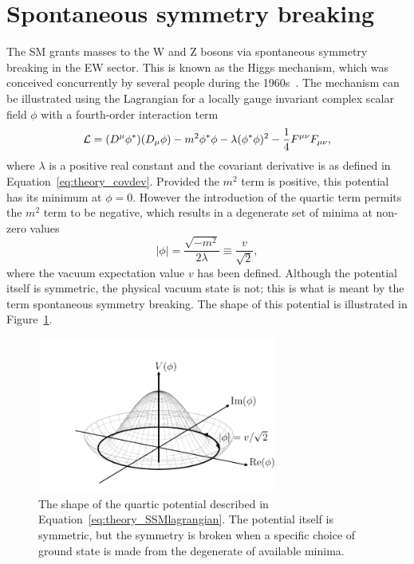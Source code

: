 \section{Spontaneous symmetry breaking}

The SM grants masses to the W and Z bosons via spontaneous symmetry breaking 
in the EW sector.
This is known as the Higgs mechanism, 
which was conceived concurrently by several people 
during the 1960s~\cite{HiggsPaper,BroutEnglert,KibbleEtc}.
The mechanism can be illustrated using the Lagrangian 
for a locally gauge invariant complex scalar field $\phi$ 
with a fourth-order interaction term~\cite{Thomson}
\begin{equation}
\label{eq:theory_SSMlagrangian}
\mathcal{L} = (D^\mu \phi^*) (D_\mu \phi) - m^2 \phi^*\phi 
        - \lambda (\phi^*\phi)^2 - \frac{1}{4} F^{\mu\nu}F_{\mu\nu} ,
\end{equation}
where $\lambda$ is a positive real constant %
and the covariant derivative is as defined in Equation~\ref{eq:theory_covdev}.
Provided the $m^2$ term is positive, this potential has its minimum at $\phi=0$.
However the introduction of the quartic term permits the $m^2$ term to be negative, 
which results in a degenerate set of minima at non-zero values
\begin{equation}
|\phi| = \frac{\sqrt{-m^2}}{2\lambda} \equiv \frac{v}{\sqrt{2}} ,
\end{equation}
where the vacuum expectation value $v$ has been defined.
Although the potential itself is symmetric, the physical vacuum state is not;
this is what is meant by the term spontaneous symmetry breaking.
The shape of this potential is illustrated in Figure~\ref{fig:theory_SSB}.

\begin{figure}[hptb]
  \centering
  \includegraphics[width=0.7\textwidth]{Figures/Theory/SSB.pdf}
  \caption[Quartic potential exhibiting spontaneous symmetry breaking.]
  {
    The shape of the quartic potential described in Equation~\ref{eq:theory_SSMlagrangian}.
    The potential itself is symmetric, 
    but the symmetry is broken when a specific choice of ground state is made 
    from the degenerate of available minima.
  }
  \label{fig:theory_SSB}
\end{figure}

